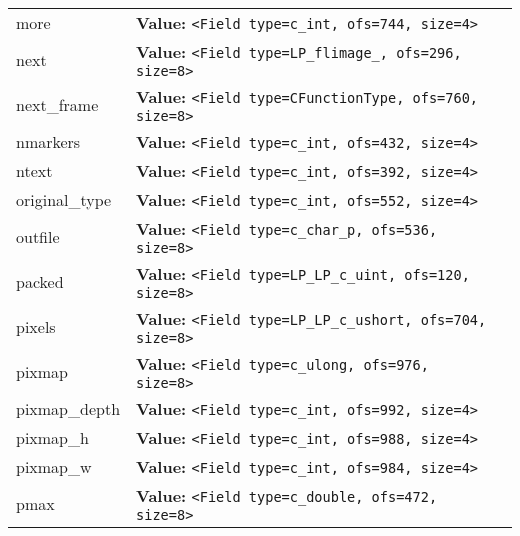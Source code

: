 \begin{longtable}{|p{\varnamewidth}|p{\vardescrwidth}|l}
\cline{1-2}
\raggedright m\-o\-r\-e\- & \raggedright \textbf{Value:} 
{\tt {\textless}Field type=c\_int, ofs=744, size=4{\textgreater}}&\\
\cline{1-2}
\raggedright n\-e\-x\-t\- & \raggedright \textbf{Value:} 
{\tt {\textless}Field type=LP\_flimage\_, ofs=296, size=8{\textgreater}}&\\
\cline{1-2}
\raggedright n\-e\-x\-t\-\_\-f\-r\-a\-m\-e\- & \raggedright \textbf{Value:} 
{\tt {\textless}Field type=CFunctionType, ofs=760, size=8{\textgreater}}&\\
\cline{1-2}
\raggedright n\-m\-a\-r\-k\-e\-r\-s\- & \raggedright \textbf{Value:} 
{\tt {\textless}Field type=c\_int, ofs=432, size=4{\textgreater}}&\\
\cline{1-2}
\raggedright n\-t\-e\-x\-t\- & \raggedright \textbf{Value:} 
{\tt {\textless}Field type=c\_int, ofs=392, size=4{\textgreater}}&\\
\cline{1-2}
\raggedright o\-r\-i\-g\-i\-n\-a\-l\-\_\-t\-y\-p\-e\- & \raggedright \textbf{Value:} 
{\tt {\textless}Field type=c\_int, ofs=552, size=4{\textgreater}}&\\
\cline{1-2}
\raggedright o\-u\-t\-f\-i\-l\-e\- & \raggedright \textbf{Value:} 
{\tt {\textless}Field type=c\_char\_p, ofs=536, size=8{\textgreater}}&\\
\cline{1-2}
\raggedright p\-a\-c\-k\-e\-d\- & \raggedright \textbf{Value:} 
{\tt {\textless}Field type=LP\_LP\_c\_uint, ofs=120, size=8{\textgreater}}&\\
\cline{1-2}
\raggedright p\-i\-x\-e\-l\-s\- & \raggedright \textbf{Value:} 
{\tt {\textless}Field type=LP\_LP\_c\_ushort, ofs=704, size=8{\textgreater}}&\\
\cline{1-2}
\raggedright p\-i\-x\-m\-a\-p\- & \raggedright \textbf{Value:} 
{\tt {\textless}Field type=c\_ulong, ofs=976, size=8{\textgreater}}&\\
\cline{1-2}
\raggedright p\-i\-x\-m\-a\-p\-\_\-d\-e\-p\-t\-h\- & \raggedright \textbf{Value:} 
{\tt {\textless}Field type=c\_int, ofs=992, size=4{\textgreater}}&\\
\cline{1-2}
\raggedright p\-i\-x\-m\-a\-p\-\_\-h\- & \raggedright \textbf{Value:} 
{\tt {\textless}Field type=c\_int, ofs=988, size=4{\textgreater}}&\\
\cline{1-2}
\raggedright p\-i\-x\-m\-a\-p\-\_\-w\- & \raggedright \textbf{Value:} 
{\tt {\textless}Field type=c\_int, ofs=984, size=4{\textgreater}}&\\
\cline{1-2}
\raggedright p\-m\-a\-x\- & \raggedright \textbf{Value:} 
{\tt {\textless}Field type=c\_double, ofs=472, size=8{\textgreater}}&\\

\end{longtable}

